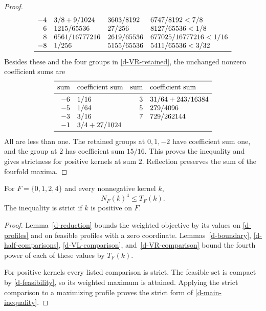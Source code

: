 \begin{proof}
\begin{equation}
\begin{array}{r l l l}
-4&3/8+9/1024&3603/8192&6747/8192<7/8\\
6&1215/65536&27/256&8127/65536<1/8\\
8&6561/16777216&2619/65536&677025/16777216<1/16\\
-8&1/256&5155/65536&5411/65536<3/32\\
\bottomrule
\end{array}
\end{equation}
Besides these and the four groups in \eqref{d-VR-retained}, the
unchanged nonzero coefficient sums are
\begin{equation}\label{d-VR-unchanged}
\begin{array}{r l r l}
\toprule
\text{sum}&\text{coefficient sum}&\text{sum}&\text{coefficient sum}\\
\midrule
-6&1/16&3&31/64+243/16384\\
-5&1/64&5&279/4096\\
-3&3/16&7&729/262144\\
-1&3/4+27/1024&&\\
\bottomrule
\end{array}
\end{equation}
All are less than one. The retained groups at $0,1,-2$ have coefficient
sum one, and the group at $2$ has coefficient sum $15/16$. This proves
the inequality and gives strictness for positive kernels at sum $2$.
Reflection preserves the sum of the fourfold maxima.
\end{proof}

\begin{proposition}\label{d-certificate}
For $F=\{0,1,2,4\}$ and every nonnegative kernel $k$,
\begin{equation}\label{d-main-inequality}
N_F(k)^4\leq T_F(k).
\end{equation}
The inequality is strict if $k$ is positive on $F$.
\end{proposition}

\begin{proof}
Lemma~\ref{d-reduction} bounds the weighted objective by its values
on \eqref{d-profiles} and on feasible profiles with a zero coordinate.
Lemmas~\ref{d-boundary}, \ref{d-half-comparisons},
\ref{d-VL-comparison}, and~\ref{d-VR-comparison} bound the fourth power
of each of these values by $T_F(k)$.

For positive kernels every listed comparison is strict. The feasible
set is compact by \eqref{d-feasibility}, so its weighted maximum is
attained. Applying the strict comparison to a maximizing profile
proves the strict form of \eqref{d-main-inequality}.
\end{proof}

